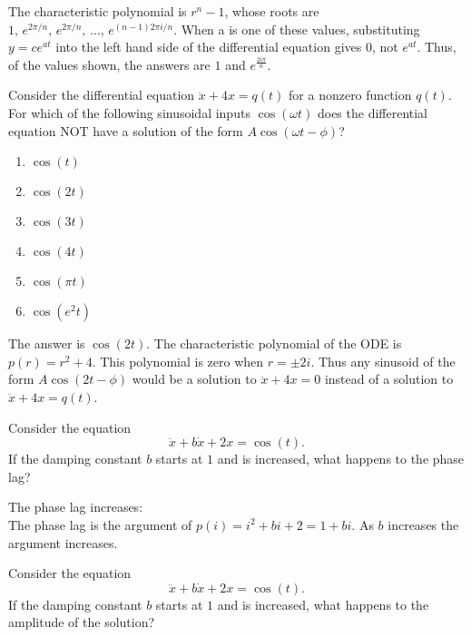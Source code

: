 The characteristic polynomial is $r^n − 1$, whose roots are
$1,\,  e^{2 \pi / n},\,e^{2 \pi / n},\, \dots , \, e^{(n-1) 2\pi i/n}$.
When a is one of these values, substituting $y=ce^{at}$ into the left hand side of
the differential equation gives $0$, not $e^{at}$.
Thus, of the values shown, the answers are $1$ and $e^{\frac{2i\pi }{n}}$.

\begin{problem}
  Consider the differential equation $\ddot x + 4x=q(t)$ for a nonzero function $q(t)$.
  For which of the following sinusoidal inputs $\cos⁡ (\omega t)$ does the differential equation
  NOT have a solution of the form $A \cos⁡(\omega t − \phi)$?
\end{problem}

\begin{enumerate}
\item $\cos (t)$
\item $\cos (2t)$
\item $\cos (3t)$
\item $\cos (4t)$
\item $\cos (\pi t)$
\item $\cos (e^2 t)$
\end{enumerate}

The answer is $\cos⁡ (2t)$.
The characteristic polynomial of the ODE is $p(r)=r^2+4$.
This polynomial is zero when $r= \pm 2i$.
Thus any sinusoid of the form $A \cos⁡ (2t− \phi)$ would be a solution to
$\ddot x + 4x=0$ instead of a solution to $\ddot x+ 4x = q(t)$.

\begin{problem}
  Consider the equation
  \begin{equation*}
    \ddot x + b\dot x + 2x = \cos (t).
  \end{equation*}
  If the damping constant $b$ starts at $1$ and is increased, what happens to the phase lag?
\end{problem}  

The phase lag increases: \\
The phase lag is the argument of $p(i)=i^2+bi+2=1+bi$. As $b$ increases the argument increases.

\begin{problem}
  Consider the equation
  \begin{equation*}
    \ddot x + b\dot x + 2x = \cos (t).
  \end{equation*}
  If the damping constant $b$ starts at $1$ and is increased,
  what happens to the amplitude of the solution?
\end{problem}

